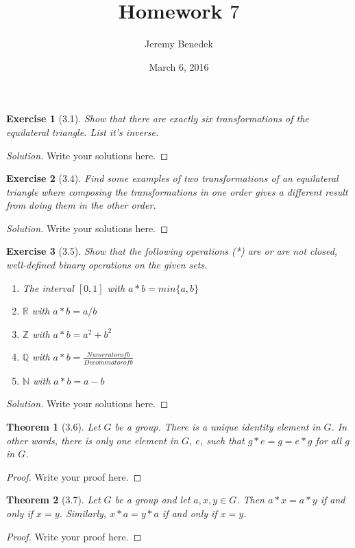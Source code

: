 \documentclass{article}
\title{Homework $7$}
\author{Jeremy Benedek}
\date{March 6, 2016}
\newtheorem*{thm}{Theorem}
\newtheorem*{ex}{Exercise}
\newenvironment{solution}
  {\begin{proof}[Solution]}
  {\renewcommand{\qedsymbol}{}\end{proof}}
\begin{document}
\maketitle

\begin{ex}[3.1]
	Show that there are exactly six transformations of the equilateral triangle. List it's inverse. 
\end{ex}
\begin{solution}
    Write your solutions here.
\end{solution}

\begin{ex}[3.4]
	Find some examples of two transformations of an equilateral triangle where composing the transformations in one order gives a different result from doing them in the other order.
\end{ex}
\begin{solution}
    Write your solutions here.
\end{solution}

\begin{ex}[3.5]
	Show that the following operations (*) are or are not closed, well-defined binary operations on the given sets. 
	\begin{enumerate}
	  \item The interval $[0,1]$ with $a*b = min\{a,b\}$
	  \item $\mathbb{R}$ with $a*b = a/b$
	  \item $\mathbb{Z}$ with $a*b = a^2 + b^2$
	  \item $\mathbb{Q}$ with $a*b = \frac{Numerator of b} {Decominator of b}$
	  \item $\mathbb{N}$ with $a*b = a-b$
	\end{enumerate}
\end{ex}
\begin{solution}
    Write your solutions here.
\end{solution}

\begin{thm}[3.6]
	Let $G$ be a group. There is a unique identity element in $G$. In other words, there is only one element in $G$, $e$, such that $g*e = g = e*g$ for all $g$ in $G$.
\end{thm}
\begin{proof}
    Write your proof here.
\end{proof}

\begin{thm}[3.7]
	Let $G$ be a group and let $a,x,y \in G$. Then $a*x = a*y$ if and only if $x=y$. Similarly, $x*a = y*a$ if and only if $x=y$.
\end{thm}
\begin{proof}
    Write your proof here.
\end{proof}
\end{document}
